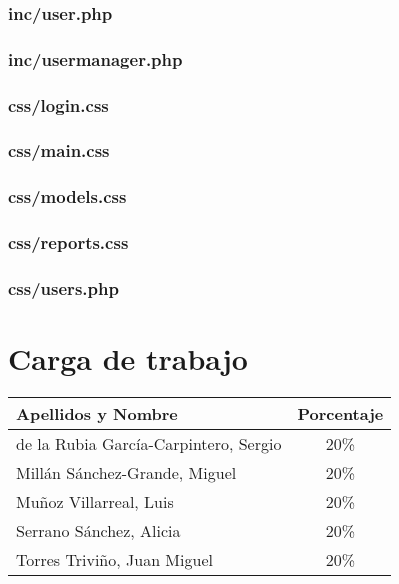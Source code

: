 \documentclass[11pt,a4paper,spanish,twoside]{book}
\begin{document}
\subsection{inc/user.php}
%

\subsection{inc/usermanager.php}
%

\subsection{css/login.css}
%

\subsection{css/main.css}
%

\subsection{css/models.css}
%

\subsection{css/reports.css}
%

\subsection{css/users.php}
%

\appendix
\chapter{Carga de trabajo}
\begin{center}
  \begin{tabular}{p{10cm}|c}
    \textbf{Apellidos y Nombre} & \textbf{Porcentaje} \\ \hline \hline
    de la Rubia García-Carpintero, Sergio & 20\% \\
    Millán Sánchez-Grande, Miguel         & 20\% \\ 
    Muñoz Villarreal, Luis                & 20\% \\ 
    Serrano Sánchez, Alicia               & 20\% \\ 
    Torres Triviño, Juan Miguel           & 20\% \\
  \end{tabular}
\end{center}

 

\end{document}

